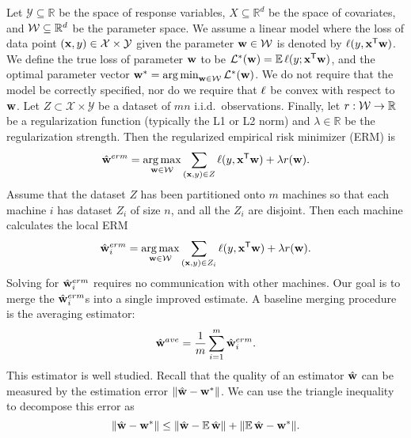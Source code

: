 \documentclass[thesis.tex]{subfiles}
\newcommand{\Y}{\mathcal{Y}}
\newcommand{\X}{\mathcal{X}}
\begin{document}
\vspace{-0.05in}
Let $\Y\subseteq\mathbb{R}$ be the space of response variables,
$X\subseteq\mathbb{R}^d$ be the space of covariates,
and ${\mathcal W}\subseteq\mathbb{R}^d$ be the parameter space.
We assume a linear model where the loss of data point $(\x,y)\in\X\times\Y$ given the parameter $\mathbf w\in{\mathcal W}$ is denoted by $\ell(y,{\mathbf{x}}^{\mathsf{T}}\mathbf w)$.
We define the true loss of parameter $\mathbf w$ to be $\mathcal{L}^*(\mathbf w) = \operatorname*{\mathbb E}\ell(y;{\mathbf{x}}^{\mathsf{T}}\mathbf w)$, 
and the optimal parameter vector ${\mathbf w^{*}}=\operatorname*{arg\,min}_{\mathbf w\in{\mathcal W}}\mathcal{L}^*(\mathbf w)$.
We do not require that the model be correctly specified,
nor do we require that $\ell$ be convex with respect to $\mathbf w$.
Let $Z\subset\X\times\Y$ be a dataset of $mn$ i.i.d.\ observations.
Finally, let $r : {\mathcal W} \to \mathbb{R}$ be a regularization function (typically the L1 or L2 norm)
and $\lambda\in\mathbb{R}$ be the regularization strength.
Then the regularized empirical risk minimizer (ERM) is
\begin{equation}
\label{eq:werm}
\hat{\mathbf w}^{erm}=\operatorname*{arg\,max}_{\mathbf w\in{\mathcal W}} \sum_{(\mathbf{x},y)\in Z} \ell(y,{\mathbf{x}}^{\mathsf{T}}\mathbf w)
+ \lambda r(\mathbf w)
.
\end{equation}
%
Assume that the dataset $Z$ has been partitioned onto $m$ machines so that each machine $i$ has dataset $Z_i$ of size $n$, and all the $Z_i$ are disjoint.
Then each machine calculates the local ERM
\begin{equation}
\label{eq:wermi}
\hat{\mathbf w}^{erm}_i = \operatorname*{arg\,max}_{\mathbf w\in{\mathcal W}} \sum_{(\mathbf{x},y) \in Z_i} \ell(y,{\mathbf{x}}^{\mathsf{T}}\mathbf w)
+ \lambda r(\mathbf w)
.
\end{equation}
Solving for $\hat{\mathbf w}^{erm}_i$ requires no communication with other machines.
Our goal is to merge the $\hat{\mathbf w}^{erm}_i$s into a single improved estimate.
A baseline merging procedure is the averaging estimator:
\begin{equation}
\hat{\mathbf w}^{ave} = \frac{1}{m}\sum_{i=1}^m \hat{\mathbf w}^{erm}_i
.
\end{equation}
This estimator is well studied.
Recall that the quality of an estimator ${\hat{\mathbf w}}$ can be measured by the estimation error ${\lVert {{\hat{\mathbf w}}-{\mathbf w^{*}}} \rVert}$. 
We can use the triangle inequality to decompose this error as
\begin{equation}
{\lVert {{\hat{\mathbf w}}-{\mathbf w^{*}}} \rVert} \le {\lVert {{\hat{\mathbf w}}-\operatorname*{\mathbb E}{\hat{\mathbf w}}} \rVert}+ {\lVert {\operatorname*{\mathbb E}{\hat{\mathbf w}}- {\mathbf w^{*}}} \rVert} .
\end{equation}
\end{document}
